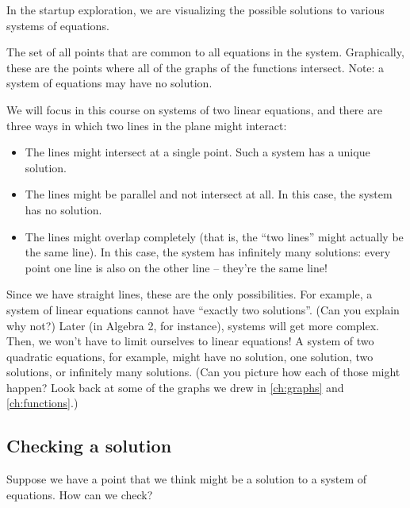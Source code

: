 
In the startup exploration, we are visualizing the possible solutions to various systems of equations.

\begin{boxdef}
The set of all points that are common to all equations in the system. Graphically, these are the points where all of the graphs of the functions intersect. Note: a system of equations may have no solution.
\end{boxdef}

We will focus in this course on systems of two linear equations, and there are three ways in which two lines in the plane might interact:
\begin{itemize}
\item The lines might intersect at a single point. Such a system has a unique solution.

\item The lines might be parallel and not intersect at all. In this case, the system has no solution.

\item The lines might overlap completely (that is, the ``two lines'' might actually be the same line). In this case, the system has infinitely many solutions: every point one line is also on the other line -- they're the same line!
\end{itemize}

Since we have straight lines, these are the only possibilities. For example, a system of linear equations cannot have ``exactly two solutions''. (Can you explain why not?) Later (in Algebra 2, for instance), systems will get more complex. Then, we won't have to limit ourselves to linear equations! A system of two quadratic equations, for example, might have no solution, one solution, two solutions, or infinitely many solutions. (Can you picture how each of those might happen? Look back at some of the graphs we drew in \cref{ch:graphs} and \cref{ch:functions}.)


\subsection{Checking a solution}

Suppose we have a point that we think might be a solution to a system of equations. How can we check?

